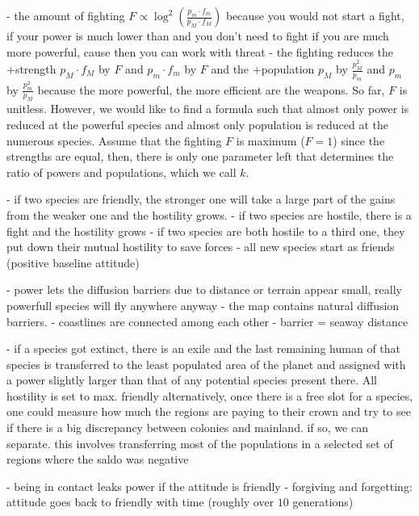 \documentclass[12pt]{article}
\begin{document}
- the amount of fighting $F \propto \log^2 \left( \frac{p_m \cdot f_m}{p_M \cdot f_M} \right)$
  because you would not start a fight, if your power is much lower
  than and you don't need to fight if you are much more powerful, 
cause then you can work with threat
 - the fighting reduces the 
        +strength $p_M \cdot f_M$ by $F$ and $p_m \cdot f_m$ by $F$ and the 
		+population $p_M$ by $\frac{ p_M^2 }{ p_m }$ and $p_m$ by $\frac{ p_m^2 }{ p_M }$ because
  the more powerful, the more efficient are the weapons.
  So far, $F$ is unitless. However, we would like to find a formula
  such that almost only power is reduced at the powerful species and almost only
  population is reduced at the numerous species. Assume that the fighting $F$
  is maximum ($F=1$) since the strengths are equal, then, there is only one
  parameter left that determines the ratio of powers and populations,
  which we call $k$.


- if two species are friendly, the stronger one will take a large part
  of the gains from the weaker one and the hostility grows.
- if two species are hostile, there is a fight and the hostility grows
- if two species are both hostile to a third one, they put down their
mutual hostility to save forces
- all new species start as friends (positive baseline attitude)

- power lets the diffusion barriers due to distance or terrain appear
  small, really powerfull species will fly anywhere anyway
- the map contains natural diffusion barriers.
- coastlines are connected among each other - barrier = seaway distance

- if a species got extinct, there is an exile and the last remaining
  human of that species is transferred to the least populated area of
  the planet and assigned with a power slightly larger than that of
  any potential species present there. All hostility is set to
  max. friendly
  alternatively, once there is a free slot for a species, one could
  measure
  how much the regions are paying to their crown and try to see if
  there
  is a big discrepancy between colonies and mainland. if so, we can
  separate. this involves transferring most of the populations in a
  selected set of regions where the saldo was negative

- being in contact leaks power if the attitude is friendly
- forgiving and forgetting: attitude goes back to friendly with time (roughly over $10$ generations)
\end{document}
